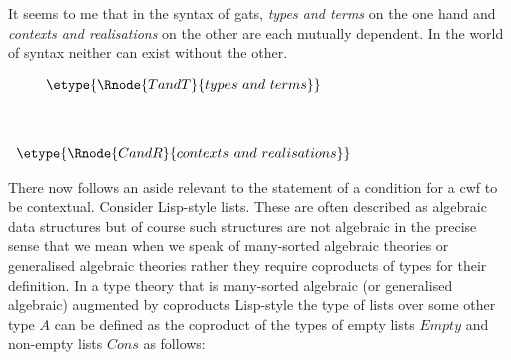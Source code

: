 \note It seems to me that in the syntax of gats, \textit{types and terms} on the one hand and \textit{contexts and realisations} on the other are each mutually dependent. In the world 
of syntax neither can exist without the other.
\begin{center}
$
\begin{array}{ c }
\etype{\Rnode{TandT}{types\ and\ terms}} \\[1.3cm]
\etype{\Rnode{CandR}{contexts\ and\ realisations}}   
\end{array}                     
$
\setlength{\sarnodesepA}{7pt}
\setlength{\sarnodesepB}{7pt}
\setlength{\saroffsetA}{7pt}
\setlength{\saroffsetB}{7pt}
\end{center}

\note 
There now follows an aside relevant to the statement of a  condition for a cwf to be contextual. Consider  Lisp-style lists. These  are often described as algebraic data structures but of course such structures are not algebraic in the precise sense that we mean when we speak of many-sorted algebraic theories or generalised algebraic theories rather they require coproducts of types for their definition. In a type theory that is many-sorted algebraic (or generalised algebraic) augmented by coproducts Lisp-style the type of lists over some other type $A$ can be defined as the coproduct of the types of empty lists $Empty$ and non-empty lists $Cons$
 as follows:\\

